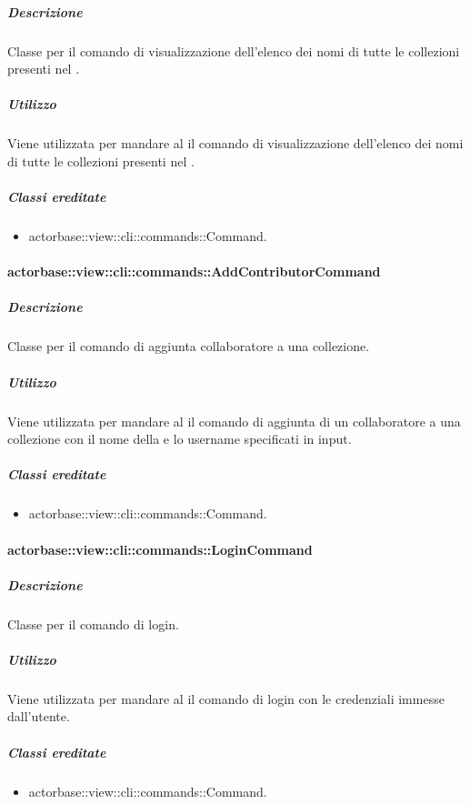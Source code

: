 \documentclass{scalatekids-article}
\begin{document}
\subparagraph{Descrizione}

Classe per il comando di visualizzazione dell'elenco dei nomi di tutte le collezioni presenti nel .

\subparagraph{Utilizzo}

Viene utilizzata per mandare al  il comando di visualizzazione dell'elenco dei nomi di tutte le collezioni presenti nel .

\subparagraph{Classi ereditate}

\begin{itemize}
\item actorbase::view::cli::commands::Command.
\end{itemize}

\paragraph{actorbase::view::cli::commands::AddContributorCommand}

\subparagraph{Descrizione}

Classe per il comando di aggiunta collaboratore a una collezione.

\subparagraph{Utilizzo}

Viene utilizzata per mandare al  il comando di aggiunta di un collaboratore a una collezione con il nome della  e lo username specificati in input.

\subparagraph{Classi ereditate}

\begin{itemize}
\item actorbase::view::cli::commands::Command.
\end{itemize}

\paragraph{actorbase::view::cli::commands::LoginCommand}

\subparagraph{Descrizione}

Classe per il comando di login.

\subparagraph{Utilizzo}

Viene utilizzata per mandare al  il comando di login con le credenziali immesse dall'utente.

\subparagraph{Classi ereditate}

\begin{itemize}
\item actorbase::view::cli::commands::Command.
\end{itemize}
\end{document}
